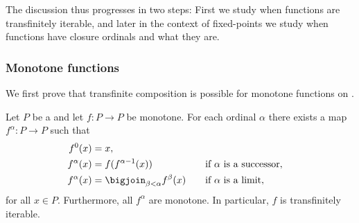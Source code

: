 The discussion thus progresses in two steps: First we study when functions are transfinitely iterable, and later in the context of fixed-points we study when functions have closure ordinals and what they are.


\subsubsection{Monotone functions}

We first prove that transfinite composition is possible for monotone functions on \cCPPOpl.

\begin{lemma}[Iteration I]
    \label{lem:iteration-1}
    Let $P$ be a \cCPPO{} and let $f \colon P \to P$ be monotone. For each ordinal $\alpha$ there exists a map $f^\alpha \colon P \to P$ such that
    \begin{alignat*}{2}
        f^0(x)
            &= x, \\
        f^\alpha(x)
            &= f(f^{\alpha-1}(x))
            \quad &&\text{if $\alpha$ is a successor}, \\
        f^\alpha(x)
            &= \bigjoin_{\beta < \alpha} f^\beta(x)
            \quad &&\text{if $\alpha$ is a limit},
    \end{alignat*}
    for all $x \in P$. Furthermore, all $f^\alpha$ are monotone. In particular, $f$ is transfinitely iterable.
\end{lemma}

